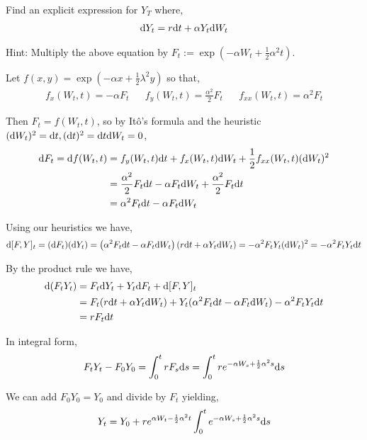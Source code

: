 \pagebreak
\begin{problem}[Exercise 8.2]
Find an explicit expression for \( Y_T \) where,
\begin{align*}
    \mathrm{d} Y_t = r \mathrm{d} t + \alpha Y_t \mathrm{d} W_t
\end{align*}

    Hint: Multiply the above equation by \( F_t := \exp(- \alpha W_t + \frac{1}{2} \alpha^2t) \).

\end{problem}


\begin{solution}[Solution]
Let \( f(x,y) = \exp(-\alpha x + \frac{1}{2} \lambda^2 y) \) so that,
\begin{align*}
    f_x(W_t,t) = -\alpha F_t && f_y(W_t,t) = \frac{\alpha^2}{2} F_t && f_{xx}(W_t,t) =  \alpha^2 F_t
\end{align*}

Then \( F_t = f(W_t,t) \), so by It\^o's formula and the heuristic \( (\mathrm{d} W_t)^2 =\mathrm{d} t, (\mathrm{d} t)^2 = \mathrm{d} t \mathrm{d} W_t = 0 \),
\begin{align*}
    \mathrm{d} F_t = \mathrm{d} f(W_t,t) &= f_y(W_t,t) \mathrm{d} t +  f_x(W_t,t) \mathrm{d} W_t + \frac{1}{2} f_{xx}(W_t,t) (\mathrm{d} W_t)^2 
    \\&= \frac{\alpha^2}{2}  F_t \mathrm{d} t -\alpha F_t \mathrm{d} W_t + \frac{\alpha^2}{2} F_t \mathrm{d} t
    \\&= \alpha^2 F_t \mathrm{d} t- \alpha F_t \mathrm{d} W_t
\end{align*}


Using our heuristics we have,
\begin{align*}
    \mathrm{d}[F,Y]_t = (\mathrm{d} F_t)(\mathrm{d} Y_t) = \left( \alpha^2 F_t \mathrm{d} t - \alpha F_t \mathrm{d} W_t \right) \left( r \mathrm{d} t + \alpha Y_t \mathrm{d} W_t \right)
    = -\alpha^2 F_tY_t (\mathrm{d} W_t)^2 
    = -\alpha^2 F_tY_t \mathrm{d} t
\end{align*}


By the product rule we have,
\begin{align*}
    \mathrm{d} (F_tY_t) &=  F_t \mathrm{d} Y_t + Y_t \mathrm{d} F_t + \mathrm{d}[F,Y]_t
    \\&= F_t (r\mathrm{d} t+\alpha Y_t \mathrm{d} W_t) + Y_t (\alpha^2 F_t \mathrm{d} t-\alpha F_t \mathrm{d} W_t) - \alpha^2 F_t Y_t \mathrm{d} t
    \\&= r F_t \mathrm{d} t 
\end{align*}

In integral form,
\begin{align*}
    F_t Y_t - F_0Y_0 = \int_{0}^{t}r F_s \mathrm{d} s = \int_{0}^{t} r e^{-\alpha W_s + \frac{1}{2} \alpha^2 s} \mathrm{d} s
\end{align*}

We can add \( F_0Y_0 = Y_0 \) and divide by \( F_t \) yielding,
\begin{align*}
    Y_t = Y_0 + r e^{\alpha W_t - \frac{1}{2}\alpha^2 t} \int_{0}^{t} e^{-\alpha W_s + \frac{1}{2} \alpha^2 s} \mathrm{d} s
\end{align*}
\end{solution}

